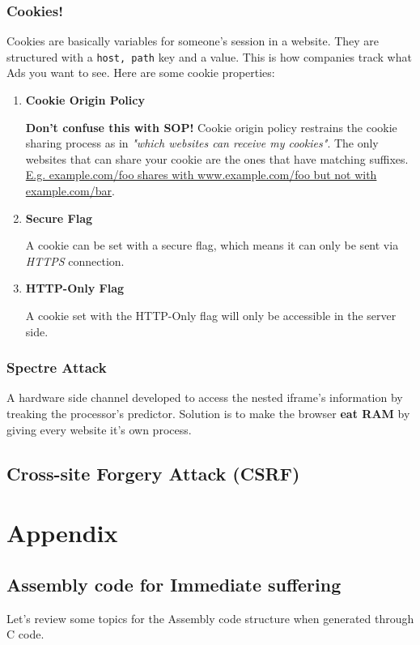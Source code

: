 \documentclass[11pt]{article}
\begin{document}
{\subsubsection{Cookies!}
\label{sec:orgf408dfe}
Cookies are basically variables for someone's session in a website. They are structured with a \texttt{host, path} key and a value. This is how companies track what Ads you want to see. Here are some cookie properties:
\begin{enumerate}
\item \textbf{Cookie Origin Policy}
\label{sec:orga5fd756}

\textbf{Don't confuse this with SOP!} Cookie origin policy restrains the cookie sharing process as in \emph{"which websites can receive my cookies"}. The only websites that can share your cookie are the ones that have matching suffixes. \uline{E.g. example.com/foo shares with www.example.com/foo but not with example.com/bar}. 
\item \textbf{Secure Flag}
\label{sec:org6e2512a}

A cookie can be set with a secure flag, which means it can only be sent via \emph{HTTPS} connection.
\item \textbf{HTTP-Only Flag}
\label{sec:org373836a}

A cookie set with the HTTP-Only flag will only be accessible in the server side.
\end{enumerate}
\subsubsection{Spectre Attack}
\label{sec:orgd8df64c}
A hardware side channel developed to access the nested iframe's information by treaking the processor's predictor. Solution is to make the browser \textbf{eat RAM} by giving every website it's own process.
\subsection{Cross-site Forgery Attack (CSRF)}
\label{sec:orgaa3d9a9}


\section{Appendix}
\label{sec:orgf66e178}
\subsection{Assembly code for Immediate suffering}
\label{sec:orgd4e0467}
\label{sec:Assemble}
Let's review some topics for the Assembly code structure when generated through C code.
}
\end{document}
